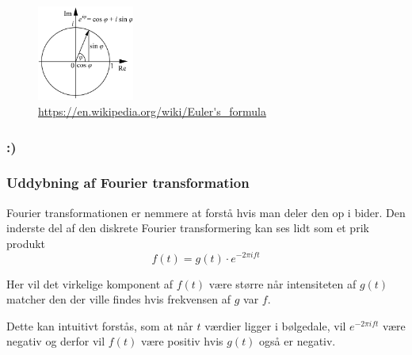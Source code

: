 \documentclass[11pt,a4paper]{article}
\begin{document}
\begin{figure}[htbp]
\centering
\includegraphics[width=120]{./eulers_formula.png}
\caption{\url{https://en.wikipedia.org/wiki/Euler's\_formula}}
\end{figure}

\subsubsection{:)}
\label{sec:org5912fd5}
\newpage

\subsubsection{Uddybning af Fourier transformation}
\label{sec:org6612cf8}

Fourier transformationen er nemmere at forstå hvis man deler den op i bider.
Den inderste del af den diskrete Fourier transformering kan ses lidt som et prik produkt
$$
f(t) = g(t) \cdot e ^{-2\pi ift}
$$

Her vil det virkelige komponent af \(f(t)\) være større når intensiteten af \(g(t)\)
matcher den der ville findes hvis frekvensen af \(g\) var \(f\).

Dette kan intuitivt forstås, som at når \(t\) værdier ligger i bølgedale, vil \(e^{-2\pi ift}\) være negativ
og derfor vil \(f(t)\) være positiv hvis \(g(t)\) også er negativ.
\end{document}
